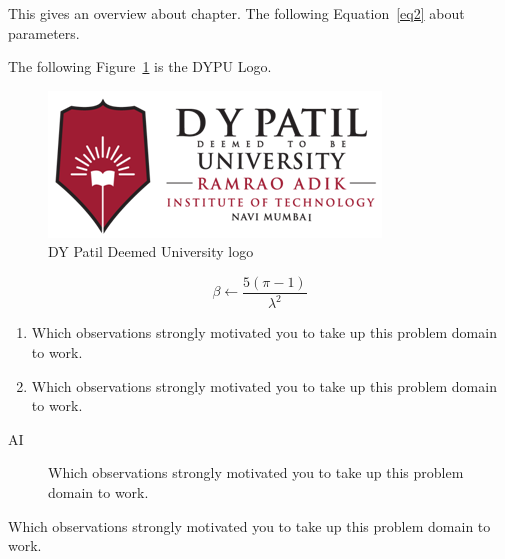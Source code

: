 \newpage

This gives an overview \cite{kunjir2017data} about chapter. The following Equation~\ref{eq2} about parameters.

 The following Figure~\ref{fig:rait-dypu-logo} is the DYPU Logo.

\begin{figure}[h]
	\centering
		\includegraphics{rait-dypu-logo.png}
	\caption{DY Patil Deemed University logo}
	\label{fig:rait-dypu-logo}
\end{figure}




\begin{equation} \label{eq1}
	\beta \leftarrow \frac{5 (\pi - 1)}{\lambda^2} 
\end{equation}




\cite{kunjir2017data}



\begin{enumerate}
	\item Which observations strongly motivated you to take up this problem domain to work.
	
	\item Which observations strongly motivated you to take up this problem domain to work.
\end{enumerate}

\begin{description}
	\item[AI] Which observations strongly motivated you to take up this problem domain to work.
\end{description}

\begin{center}	
	Which observations strongly motivated you to take up this problem domain to work.
\end{center}


